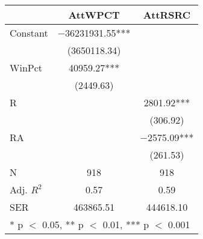 \begin{table}
\centering
\begin{tabular}[t]{lcc}
\toprule
  & AttWPCT & AttRSRC\\
\midrule
Constant & \num{-36231931.55}*** & \\
 & (\num{3650118.34}) & \\
WinPct & \num{40959.27}*** & \\
 & (\num{2449.63}) & \\
R &  & \num{2801.92}***\\
 &  & (\num{306.92})\\
RA &  & \num{-2575.09}***\\
 &  & (\num{261.53})\\
\midrule
N & \num{918} & \num{918}\\
Adj. $R^2$ & \num{0.57} & \num{0.59}\\
SER & \num{463865.51} & \num{444618.10}\\
\bottomrule
\multicolumn{3}{l}{\rule{0pt}{1em}* p $<$ 0.05, ** p $<$ 0.01, *** p $<$ 0.001}\\
\end{tabular}
\end{table}
